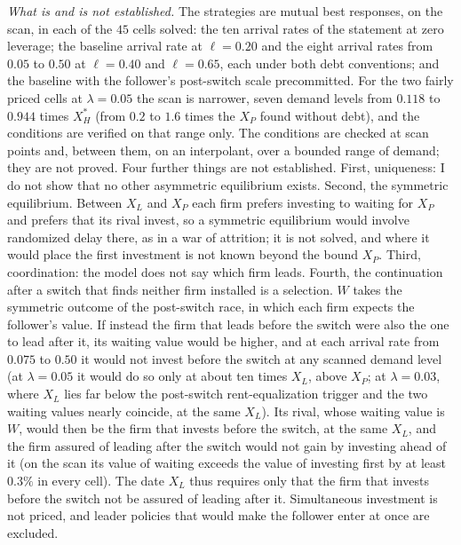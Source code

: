 \documentclass[
  11pt,
  letterpaper,
]{scrartcl}
\begin{document}
\emph{What is and is not established.} The strategies are mutual best
responses, on the scan, in each of the \(45\) cells solved: the ten
arrival rates of the statement at zero leverage; the baseline arrival
rate at \(\ell = 0.20\) and the eight arrival rates from \(0.05\) to
\(0.50\) at \(\ell = 0.40\) and \(\ell = 0.65\), each under both debt
conventions; and the baseline with the follower's post-switch scale
precommitted. For the two fairly priced cells at \(\lambda = 0.05\) the
scan is narrower, seven demand levels from \(0.118\) to \(0.944\) times
\(X_H^*\) (from \(0.2\) to \(1.6\) times the \(X_P\) found without
debt), and the conditions are verified on that range only. The
conditions are checked at scan points and, between them, on an
interpolant, over a bounded range of demand; they are not proved. Four
further things are not established. First, uniqueness: I do not show
that no other asymmetric equilibrium exists. Second, the symmetric
equilibrium. Between \(X_L\) and \(X_P\) each firm prefers investing to
waiting for \(X_P\) and prefers that its rival invest, so a symmetric
equilibrium would involve randomized delay there, as in a war of
attrition; it is not solved, and where it would place the first
investment is not known beyond the bound \(X_P\). Third, coordination:
the model does not say which firm leads. Fourth, the continuation after
a switch that finds neither firm installed is a selection. \(W\) takes
the symmetric outcome of the post-switch race, in which each firm
expects the follower's value. If instead the firm that leads before the
switch were also the one to lead after it, its waiting value would be
higher, and at each arrival rate from \(0.075\) to \(0.50\) it would not
invest before the switch at any scanned demand level (at
\(\lambda = 0.05\) it would do so only at about ten times \(X_L\), above
\(X_P\); at \(\lambda = 0.03\), where \(X_L\) lies far below the
post-switch rent-equalization trigger and the two waiting values nearly
coincide, at the same \(X_L\)). Its rival, whose waiting value is \(W\),
would then be the firm that invests before the switch, at the same
\(X_L\), and the firm assured of leading after the switch would not gain
by investing ahead of it (on the scan its value of waiting exceeds the
value of investing first by at least \(0.3\%\) in every cell). The date
\(X_L\) thus requires only that the firm that invests before the switch
not be assured of leading after it. Simultaneous investment is not
priced, and leader policies that would make the follower enter at once
are excluded.
\end{document}
